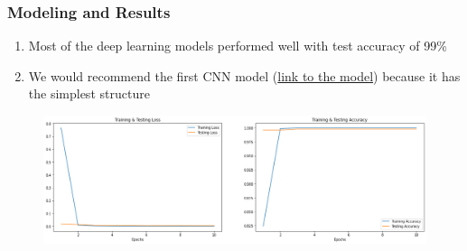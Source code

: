 \documentclass[xcolor={table}]{beamer}
\begin{document}



    


\begin{frame}
\frametitle{Modeling and Results}
\vspace{0.5cm}
\begin{enumerate}
    \item Most of the deep learning models performed well with test accuracy of 99\% 
    \item We would recommend the first CNN model (\textcolor{blue}{\href{https://github.com/miladshiraniUCB/Emotion-Detection-in-Speech/blob/main/Notebook/Modeling-CNN-and-Transfer-Learning.ipynb}{link to the model}}) because it has the simplest structure
\end{enumerate}    


\begin{figure}%
  \includegraphics[width=0.9\linewidth]{results.png}
\end{figure}

\end{frame}

		

\end{document}
